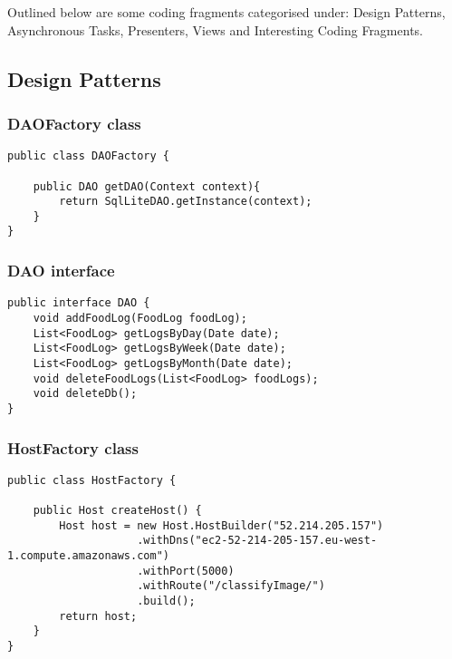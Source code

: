 Outlined below are some coding fragments categorised under: Design Patterns, Asynchronous Tasks, Presenters, Views and Interesting Coding Fragments.

\subsection*{Design Patterns}
\subsubsection*{DAOFactory class}
\begin{lstlisting}[style=Java]
public class DAOFactory {

    public DAO getDAO(Context context){
        return SqlLiteDAO.getInstance(context);
    }
}
\end{lstlisting}

\subsubsection*{DAO interface}
\begin{lstlisting}[style=Java]
public interface DAO {
    void addFoodLog(FoodLog foodLog);
    List<FoodLog> getLogsByDay(Date date);
    List<FoodLog> getLogsByWeek(Date date);
    List<FoodLog> getLogsByMonth(Date date);
    void deleteFoodLogs(List<FoodLog> foodLogs);
    void deleteDb();
}
\end{lstlisting}

\subsubsection*{HostFactory class}
\begin{lstlisting}[style=Java]
public class HostFactory {

    public Host createHost() {
        Host host = new Host.HostBuilder("52.214.205.157")
                    .withDns("ec2-52-214-205-157.eu-west-1.compute.amazonaws.com")
                    .withPort(5000)
                    .withRoute("/classifyImage/")
                    .build();
        return host;
    }
}
\end{lstlisting}

